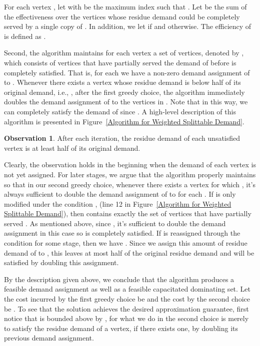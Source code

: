 \documentclass[a4paper,11pt]{article}
\theoremstyle{definition}
\newtheorem{observation}{Observation}
\begin{document}
\smallskip

For each vertex , let  with  be the maximum index such that
.
Let  be the sum of the effectiveness over the vertices whose residue demand could be completely served by a single copy of . In addition, we let  if  and  otherwise. The efficiency of  is defined as .

Second, the algorithm maintains for each vertex  a set of vertices, denoted by , which consists of vertices that have partially served the demand of  before  is completely satisfied. 
That is, for each  we have a non-zero demand assignment of  to . Whenever there exists a vertex  whose residue demand is below half of its original demand, i.e., , after the first greedy choice, the algorithm immediately doubles the demand assignment of  to the vertices in . Note that in this way, we can completely satisfy the demand of  since  . A high-level description of this algorithm is presented in Figure~\ref{Algorithm for
Weighted Splittable Demand}.

\begin{observation} \label{observation_splittable_half}
After each iteration, the residue demand of each unsatisfied vertex is at least half of its original demand.
\end{observation}

Clearly, the observation holds in the beginning when the demand of each vertex is not yet assigned. For later stages, we argue that the algorithm properly maintains  so that in our second greedy choice, whenever there exists a vertex  for which , it's always sufficient to double the demand assignment  of  to  for each . If  is only modified under the condition , (line 12 in Figure~\ref{Algorithm for Weighted Splittable Demand}), then  contains exactly the set of vertices that have partially served . As mentioned above, since , it's sufficient to double the demand assignment in this case so  is completely satisfied. If  is reassigned through the condition  for some stage, then we have . Since we assign this amount  of residue demand of  to , this leaves at most half of the original residue demand and  will be satisfied by doubling this assignment.

\smallskip

By the description given above, we conclude that the algorithm produces a feasible demand assignment as well as a feasible capacitated dominating set. Let the cost incurred by the first greedy choice be  and the cost by the second choice be . To see that the solution achieves the desired approximation guarantee, first notice that  is bounded above by , for what we do in the second choice is merely to satisfy the residue demand of a vertex, if there exists one, by doubling its previous demand assignment.
\end{document}

